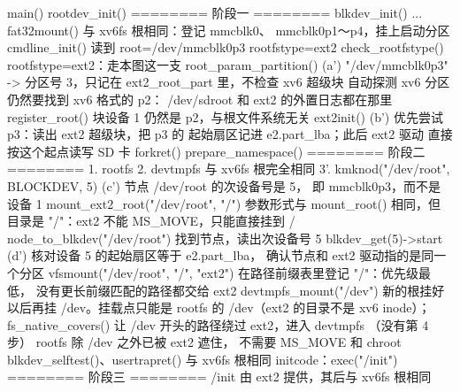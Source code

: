 \begin{txtcode}
main()
  rootdev_init()                       ======== 阶段一 ========
    blkdev_init() ... fat32mount()     与 xv6fs 根相同：登记 mmcblk0、
                                       mmcblk0p1～p4，挂上启动分区
    cmdline_init()                     读到 root=/dev/mmcblk0p3 rootfstype=ext2
    check_rootfstype()                 rootfstype=ext2：走本图这一支
    root_param_partition()        (a') "/dev/mmcblk0p3" -> 分区号 3，只记在
                                       ext2_root_part 里，不检查 xv6 超级块
    自动探测 xv6 分区                  仍然要找到 xv6 格式的 p2：
                                       /dev/sdroot 和 ext2 的外置日志都在那里
    register_root()                    块设备 1 仍然是 p2，与根文件系统无关
  ext2init()                      (b') 优先尝试 p3：读出 ext2 超级块，把 p3 的
                                       起始扇区记进 e2.part_lba；此后 ext2 驱动
                                       直接按这个起点读写 SD 卡
forkret()
  prepare_namespace()                  ======== 阶段二 ========
    1. rootfs  2. devtmpfs             与 xv6fs 根完全相同
    3'. kmknod("/dev/root", BLOCKDEV, 5)
                                  (c') 节点 /dev/root 的次设备号是 5，
                                       即 mmcblk0p3，而不是设备 1
       mount_ext2_root("/dev/root", "/")
                                       参数形式与 mount_root() 相同，但目录是
                                       "/"：ext2 不能 MS_MOVE，只能直接挂到 /
         node_to_blkdev("/dev/root")   找到节点，读出次设备号 5
         blkdev_get(5)->start     (d') 核对设备 5 的起始扇区等于 e2.part_lba，
                                       确认节点和 ext2 驱动指的是同一个分区
         vfsmount("/dev/root", "/", "ext2")
                                       在路径前缀表里登记 "/"：优先级最低，
                                       没有更长前缀匹配的路径都交给 ext2
       devtmpfs_mount("/dev")          新的根挂好以后再挂 /dev。挂载点只能是
                                       rootfs 的 /dev（ext2 的目录不是 xv6
                                       inode）；fs_native_covers() 让 /dev
                                       开头的路径绕过 ext2，进入 devtmpfs
    （没有第 4 步）                    rootfs 除 /dev 之外已被 ext2 遮住，
                                       不需要 MS_MOVE 和 chroot
  blkdev_selftest()、usertrapret()     与 xv6fs 根相同
initcode：exec("/init")                ======== 阶段三 ========
                                       /init 由 ext2 提供，其后与 xv6fs 根相同
\end{txtcode}

